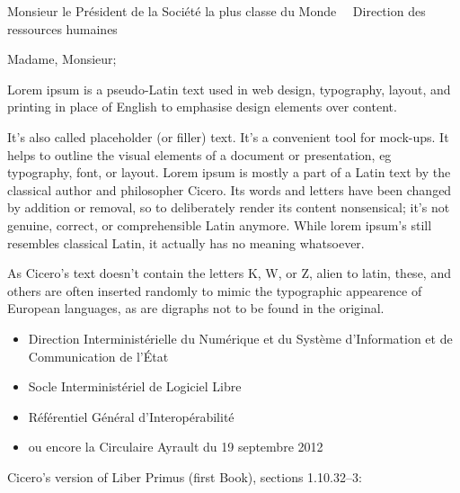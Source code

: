 \documentclass{scrlttr2}
\renewcommand{\\}{~{\large\textperiodcentered}~}%
\begin{document}

\begin{letter}{ %
Monsieur le Président de
la Société la plus classe du Monde\\
Direction des ressources humaines\\

}


\opening {Madame, Monsieur;}


Lorem ipsum is a pseudo-Latin text used in web design, typography, layout, and printing in place of English to emphasise design elements over content. \\

It's also called placeholder (or filler) text. It's a convenient tool for mock-ups. It helps to outline the visual elements of a document or presentation, eg typography, font, or layout. Lorem ipsum is mostly a part of a Latin text by the classical author and philosopher Cicero. Its words and letters have been changed by addition or removal, so to deliberately render its content nonsensical; it's not genuine, correct, or comprehensible Latin anymore. While lorem ipsum's still resembles classical Latin, it actually has no meaning whatsoever. \\

As Cicero's text doesn't contain the letters K, W, or Z, alien to latin, these, and others are often inserted randomly to mimic the typographic appearence of European languages, as are digraphs not to be found in the original.\\

\begin{itemize}
	\item Direction Interministérielle du Numérique et du Système d'Information et de Communication de l'État
	\item Socle Interministériel de Logiciel Libre
	\item Référentiel Général d'Interopérabilité
	\item ou encore la Circulaire Ayrault du 19 septembre 2012
\end{itemize}


Cicero's version of Liber Primus (first Book), sections 1.10.32–3:\\


\end{letter}
\end{document}
